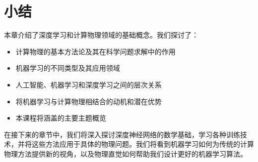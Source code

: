 \section{小结}
\label{sec:summary}

本章介绍了深度学习和计算物理领域的基础概念。我们探讨了：

\begin{itemize}
\item 计算物理的基本方法论及其在科学问题求解中的作用
\item 机器学习的不同类型及其应用领域
\item 人工智能、机器学习和深度学习之间的层次关系
\item 将机器学习与计算物理相结合的动机和潜在优势
\item 本课程将涵盖的主要主题概览
\end{itemize}

在接下来的章节中，我们将深入探讨深度神经网络的数学基础，学习各种训练技术，并将这些方法应用于具体的物理问题。我们将看到机器学习如何为传统的计算物理方法提供新的视角，以及物理直觉如何帮助我们设计更好的机器学习算法。

\newpage
